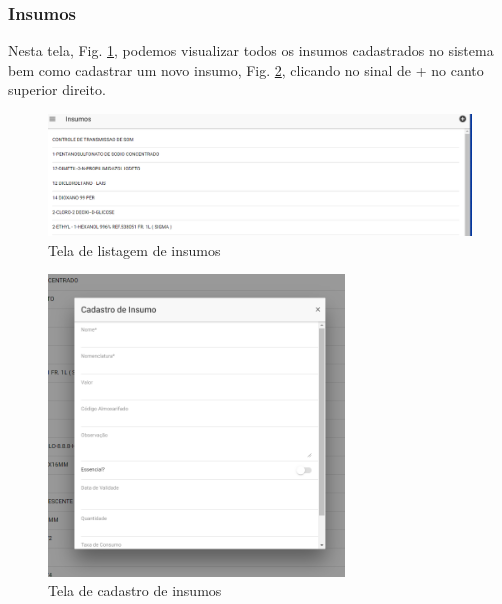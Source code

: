 \documentclass[letterpaper, 12 pt]{article}
\begin{document}
\subsubsection{Insumos}
Nesta tela, Fig. \ref{figura:insumo1}, podemos visualizar todos os insumos cadastrados no sistema bem como cadastrar um novo insumo, Fig. \ref{figura:insumocadastro1}, clicando no sinal de + no canto superior direito.

\begin{figure}[h]
\centering %
\includegraphics[width=14cm]{imagens/insumo1.PNG} 
\caption{Tela de listagem de insumos}
\label{figura:insumo1}
\end{figure}

\begin{figure}[h]
\centering %
\includegraphics[height=8cm]{imagens/insumocadastro1.PNG} 
\caption{Tela de cadastro de insumos}
\label{figura:insumocadastro1}
\end{figure}
%

\end{document}
